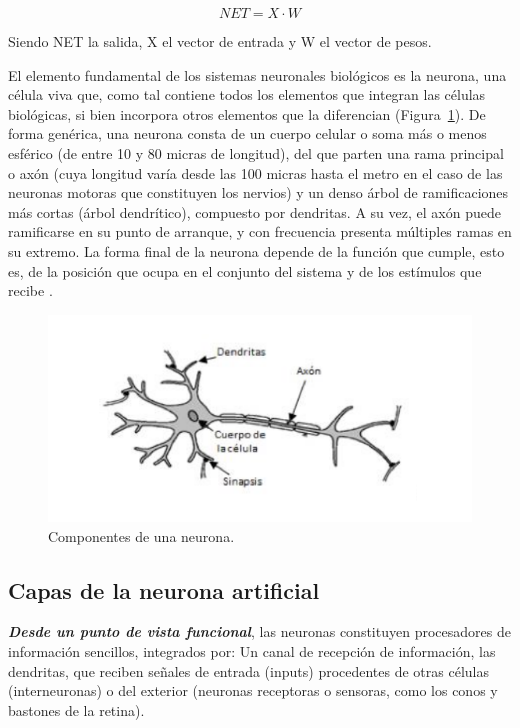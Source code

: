 \[
NET = X \cdot W
\]

Siendo NET la salida, X el vector de entrada y W el vector de pesos. 

\vspace{1\baselineskip}
El elemento fundamental de los sistemas neuronales biológicos es la neurona, una célula viva que, como tal contiene todos los elementos que integran las células biológicas, si bien incorpora otros elementos que la diferencian (Figura~\ref{fig:componentes}). De forma genérica, una neurona consta de un cuerpo celular o soma más o menos esférico (de entre 10 y 80 micras de longitud), del que parten una rama principal o axón (cuya longitud varía desde las 100 micras hasta el metro en el caso de las neuronas motoras que constituyen los nervios) y un denso árbol de ramificaciones más cortas (árbol dendrítico), compuesto por dendritas. A su vez, el axón puede ramificarse en su punto de arranque, y con frecuencia presenta múltiples ramas en su extremo. La forma final de la neurona depende de la función que cumple, esto es, de la posición que ocupa en el conjunto del sistema y de los estímulos que recibe \cite{lopez2008redes}.

\begin{figure}[H]
  \begin{center}
    \includegraphics[scale=0.90]{./neuroma_humana.png}
    \caption{Componentes de una neurona.}
    \label{fig:componentes}
  \end{center}
\end{figure}


\subsection{Capas de la neurona artificial}
\textbf{\textit{Desde un punto de vista funcional}}, las neuronas constituyen procesadores de información sencillos, integrados por:
Un canal de recepción de información, las dendritas, que reciben señales de entrada (inputs) procedentes de otras células (interneuronas) o del exterior (neuronas receptoras o sensoras, como los conos y bastones de la retina).

